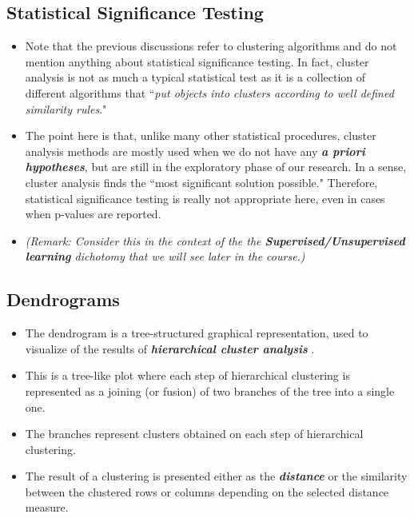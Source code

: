 \subsection{Statistical Significance Testing}

\begin{itemize}
\item Note that the previous discussions refer to clustering algorithms and do not mention anything about statistical significance testing. In fact, cluster analysis is not as much a typical statistical test as it is a collection of different algorithms that ``\textit{put objects into clusters according to well defined similarity rules}."
	
\item The point here is that, unlike many other statistical procedures, cluster analysis methods are mostly used when we do not have any \textbf{\textit{a priori hypotheses}}, but are still in the exploratory phase of our research. In a sense, cluster analysis finds the ``most significant solution possible." Therefore, statistical significance testing is really not appropriate here, even in cases when p-values are reported.
\item \textit{(Remark: Consider this in the context of the the \textbf{Supervised/Unsupervised learning} dichotomy that we will see later in the course.)}
\end{itemize}


\subsection{Dendrograms}
\begin{itemize}
	
\item The dendrogram is a tree-structured graphical representation, used to visualize of the results of \textbf{\textit{hierarchical cluster analysis}} . 
\item This is a tree-like plot where each step of hierarchical clustering is represented as a joining (or fusion) of two branches of the tree into a single one. 
\item The branches represent clusters obtained on each step of hierarchical clustering. 
\item The result of a clustering is presented either as the \textbf{\textit{distance}} or the similarity between the clustered rows or columns depending on the selected distance measure.
\end{itemize}

